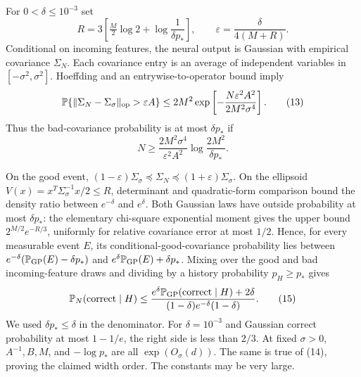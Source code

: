 \documentclass[11pt]{article}
\newcommand{\Pp}{\mathbb P}\newcommand{\one}{\mathbf1}
\begin{document}
For $0<\delta\le10^{-3}$ set
\[
 R=3\left[\tfrac M2\log2+\log\frac1{\delta p_*}\right],
 \qquad \varepsilon=\frac{\delta}{4(M+R)}.
\]
Conditional on incoming features, the neural output is Gaussian with
empirical covariance $\Sigma_N$. Each covariance entry is an average
of independent variables in $[-\sigma^2,\sigma^2]$.
Hoeffding and an entrywise-to-operator bound imply
\[
 \Pp\{\|\Sigma_N-\Sigma_\sigma\|_{\rm op}>\varepsilon A\}
   \le2M^2\exp\left[-\frac{N\varepsilon^2 A^2}{2M^2\sigma^4}\right].
                                                               \tag{13}
\]
Thus the bad-covariance probability is at most $\delta p_*$ if
\[
 N\ge \frac{2M^2\sigma^4}{\varepsilon^2 A^2}
                                  \log\frac{2M^2}{\delta p_*}.  \tag{14}
\]

On the good event,
$(1-\varepsilon)\Sigma_\sigma\preceq\Sigma_N
\preceq(1+\varepsilon)\Sigma_\sigma$.
On the ellipsoid $V(x)=x^T\Sigma_\sigma^{-1}x/2\le R$, determinant
and quadratic-form comparison bound the density ratio between
$e^{-\delta}$ and $e^\delta$.
Both Gaussian laws have outside probability at most $\delta p_*$:
the elementary chi-square exponential moment gives the upper bound
$2^{M/2}e^{-R/3}$, uniformly for relative covariance error at most $1/2$.
Hence, for every measurable event $E$, its conditional-good-covariance
probability lies between
$e^{-\delta}(\Pp_{\rm GP}(E)-\delta p_*)$ and
$e^\delta\Pp_{\rm GP}(E)+\delta p_*$.
Mixing over the good and bad incoming-feature draws and dividing by a
history probability $p_H\ge p_*$ gives
\[
 \Pp_N(\text{correct}\mid H)
 \le\frac{e^\delta\Pp_{\rm GP}(\text{correct}\mid H)+2\delta}
              {(1-\delta)e^{-\delta}(1-\delta)}.        \tag{15}
\]
We used $\delta p_*\le\delta$ in the denominator.
For $\delta=10^{-3}$ and Gaussian correct probability at most
$1-1/e$, the right side is less than $2/3$.
At fixed $\sigma>0$, $A^{-1},B,M$, and $-\log p_*$ are all
$\exp(O_\sigma(d))$. The same is true of (14), proving the claimed
width order. The constants may be very large.
\end{document}
